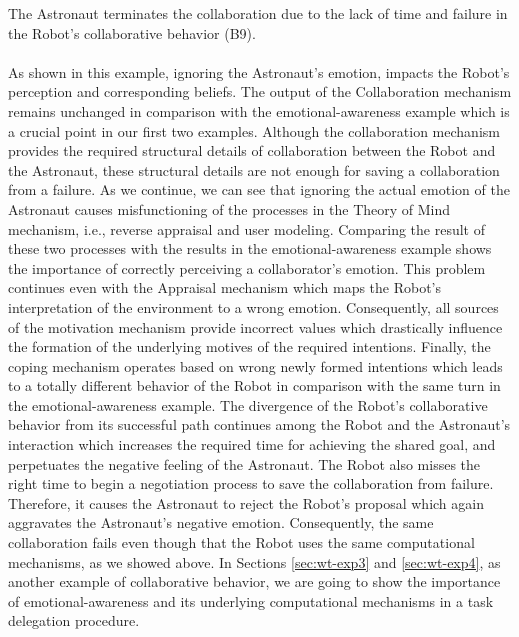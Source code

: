 The Astronaut terminates the collaboration due to the lack of time and failure
in the Robot's collaborative behavior (B9).\\

\noindent{}\\

As shown in this example, ignoring the Astronaut's emotion, impacts the Robot's
perception and corresponding beliefs. The output of the Collaboration mechanism
remains unchanged in comparison with the emotional-awareness example which is a
crucial point in our first two examples. Although the collaboration mechanism
provides the required structural details of collaboration between the Robot and
the Astronaut, these structural details are not enough for saving a
collaboration from a failure. As we continue, we can see that ignoring the
actual emotion of the Astronaut causes misfunctioning of the processes in the
Theory of Mind mechanism, i.e., reverse appraisal and user modeling. Comparing
the result of these two processes with the results in the emotional-awareness
example shows the importance of correctly perceiving a collaborator's emotion.
This problem continues even with the Appraisal mechanism which maps the Robot's
interpretation of the environment to a wrong emotion. Consequently, all
sources of the motivation mechanism provide incorrect values which drastically
influence the formation of the underlying motives of the required intentions.
Finally, the coping mechanism operates based on wrong newly formed intentions
which leads to a totally different behavior of the Robot in comparison with the
same turn in the emotional-awareness example. The divergence of the Robot's
collaborative behavior from its successful path continues among the Robot and
the Astronaut's interaction which increases the required time for achieving the
shared goal, and perpetuates the negative feeling of the Astronaut. The Robot
also misses the right time to begin a negotiation process to save the
collaboration from failure. Therefore, it causes the Astronaut to reject the
Robot's proposal which again aggravates the Astronaut's negative emotion.
Consequently, the same collaboration fails even though that the Robot uses the
same computational mechanisms, as we showed above. In Sections \ref{sec:wt-exp3}
and \ref{sec:wt-exp4}, as another example of collaborative behavior, we are
going to show the importance of emotional-awareness and its underlying
computational mechanisms in a task delegation procedure.

